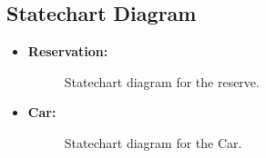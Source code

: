 \documentclass[a4paper]{article}
\begin{document}
\subsection{Statechart Diagram}
\begin {itemize}
\item \textbf{Reservation:}
\begin{figure}[h]
\centering
\vspace*{\fill}
\noindent{}%
\caption {Statechart diagram for the reserve.}
\vspace*{0.2cm}
\end{figure}

\item \textbf{Car:}
\begin{figure}[h!]
\centering
\vspace*{\fill}
\noindent{}%
\caption {Statechart diagram for the Car.}
\vspace*{0.2cm}
\end{figure}

\end{itemize}
\newpage
\end{document}
